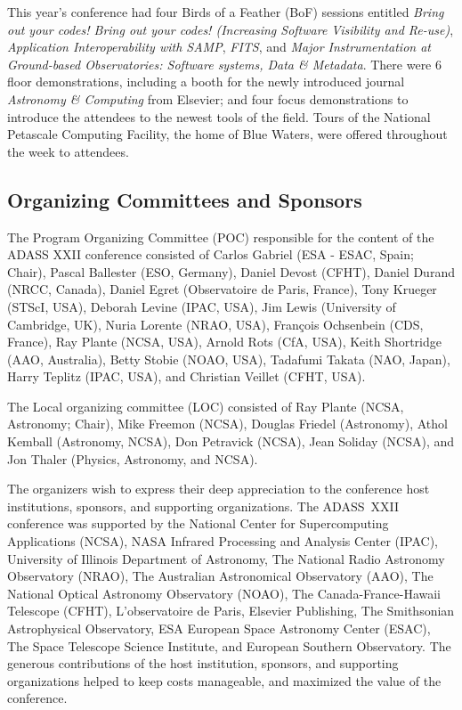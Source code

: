 This year's conference had four Birds of a Feather (BoF) sessions entitled \textit{Bring out your codes! Bring out your codes! (Increasing Software Visibility and Re-use)}, \textit{Application Interoperability with SAMP}, \textit{FITS}, and \textit{Major Instrumentation at Ground-based Observatories: Software systems, Data \& Metadata}. There were 6 floor demonstrations, including a booth for the newly introduced journal \textit{Astronomy \& Computing} from Elsevier; and four focus demonstrations to introduce the attendees to the newest tools of the field. Tours of the National Petascale Computing Facility, the home of Blue Waters, were offered throughout the week to attendees.

\subsection{Organizing Committees and Sponsors}

The Program Organizing Committee (POC) responsible for the content of the ADASS XXII conference consisted of Carlos Gabriel (ESA - ESAC, Spain; Chair), Pascal Ballester (ESO, Germany), Daniel Devost (CFHT), Daniel Durand (NRCC, Canada), Daniel Egret (Observatoire de Paris, France), Tony Krueger (STScI, USA), Deborah Levine (IPAC, USA), Jim Lewis (University of Cambridge, UK), Nuria Lorente (NRAO, USA), François Ochsenbein (CDS, France), Ray Plante (NCSA, USA), Arnold Rots (CfA, USA), Keith Shortridge (AAO, Australia), Betty Stobie (NOAO, USA), Tadafumi Takata (NAO, Japan), Harry Teplitz (IPAC, USA), and Christian Veillet (CFHT, USA).

The Local organizing committee (LOC) consisted of Ray Plante (NCSA, Astronomy; Chair), Mike Freemon (NCSA), Douglas Friedel (Astronomy), Athol Kemball (Astronomy, NCSA), Don Petravick (NCSA), Jean Soliday (NCSA), and Jon Thaler (Physics, Astronomy, and NCSA).
    
The organizers wish to express their deep appreciation to the conference host institutions, sponsors, and supporting organizations. The ADASS~XXII conference was supported by the National Center for Supercomputing Applications (NCSA), NASA Infrared Processing and Analysis Center (IPAC), University of Illinois Department of Astronomy, The National Radio Astronomy Observatory (NRAO), The Australian Astronomical Observatory (AAO), The National Optical Astronomy Observatory (NOAO), The Canada-France-Hawaii Telescope (CFHT), L'observatoire de Paris, Elsevier Publishing, The Smithsonian Astrophysical Observatory, ESA European Space Astronomy Center (ESAC), The Space Telescope Science Institute, and European Southern Observatory. The generous contributions of the host institution, sponsors, and supporting organizations helped to keep costs manageable, and maximized the value of the conference.

